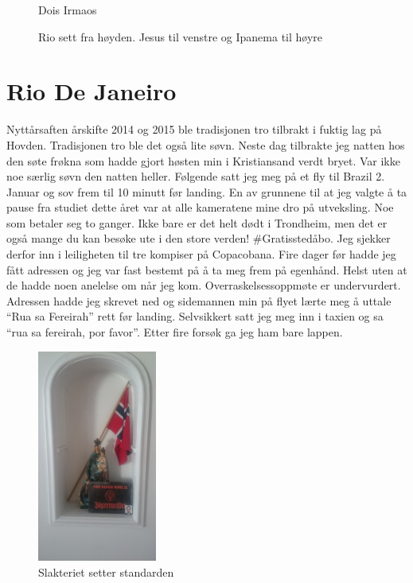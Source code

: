 

\begin{figure}[H]
	\centering
	\noindent{}
\caption*{Dois Irmaos}
	\label{fig:doisermaos}
\end{figure}
\clearpage
\begin{figure}[H]
	\centering
	\noindent{}
	\caption*{Rio sett fra høyden. Jesus til venstre og Ipanema
	til høyre}
	\label{fig:doishoyre}
\end{figure}
\clearpage
\section{Rio De Janeiro}
Nyttårsaften årskifte 2014 og 2015 ble tradisjonen tro tilbrakt i
fuktig lag på Hovden. Tradisjonen tro ble det også lite søvn. Neste
dag tilbrakte jeg natten hos den søte frøkna som hadde gjort høsten
min i Kristiansand verdt bryet. Var ikke noe
særlig søvn den natten heller. Følgende satt jeg meg på et
fly til Brazil 2. Januar og sov frem til 10 minutt før landing. 
En av grunnene til at jeg valgte å ta pause fra studiet dette året var
at alle kameratene mine dro på utveksling. Noe som betaler seg to
ganger. Ikke bare er det helt dødt i Trondheim, men det er også mange
du kan besøke ute i den store verden! \#Gratisstedåbo. Jeg sjekker
derfor inn i leiligheten til tre kompiser på Copacobana.
Fire dager før hadde jeg fått adressen og jeg var fast bestemt på å ta
meg frem på egenhånd. Helst uten at de hadde noen anelelse om når jeg
kom. Overraskelsessoppmøte er undervurdert. Adressen hadde jeg skrevet
ned og sidemannen min på flyet lærte meg å uttale ``Rua sa Fereirah'' rett før
landing. Selvsikkert satt jeg meg inn i taxien og sa ``rua sa fereirah, por
favor''. Etter fire forsøk ga jeg ham bare lappen.\\ 
\begin{figure}
	\begin{center}
		\includegraphics[width=0.35\textwidth]{slakteriet}
	\end{center}
	\caption*{Slakteriet setter standarden}
\end{figure}
